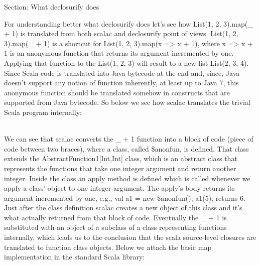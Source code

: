 Section: What declosurify does

For understanding better what declosurify does let's see how List(1, 2, 3).map(_
+ 1)  is translated from both scalac and declosurify point
of views. List(1, 2, 3).map(_ + 1) is a shortcut for List(1, 2, 3).map(x => x +
1), where x => x + 1 is an anonymous function that returns its
argument incremented by one.
Applying that function to the List(1, 2, 3) will result to a new list List(2,
3, 4). Since Scala code is translated into Java bytecode at the end and, since,
Java  doesn't support any notion of function inherently, at least up to Java 7,
this anonymous function should be translated somehow in constructs that are
supported from Java bytecode. So below we see how scalac translates the trivial
Scala program internally:\\
 \\



We can see that scalac converts the _ + 1 function into a block of code
(piece of code between two braces), where a class, called \$anonfun, is defined.
That class
extends the AbstractFunction1[Int,Int] class, which is an abstract
class that represents the functions that take one integer argument and return
another integer. Inside the class an apply method is defined which is called
whenever we apply a class' object to one integer argument. The apply's body
returns  its argument incremented by one,  e.g., val a1 = new \$anonfun();
a1(5); returns 6. Just after the class definition scalac creates a new object
of this class and it's what actually returned from that block of code.
Eventually the _ + 1 is substituted with an object of a subclass of a class
representing functions internally, which leads us to the conclusion that the
scala source-level closures are translated to function class objects. Below we
attach the basic map implementation in the standard Scala library:

